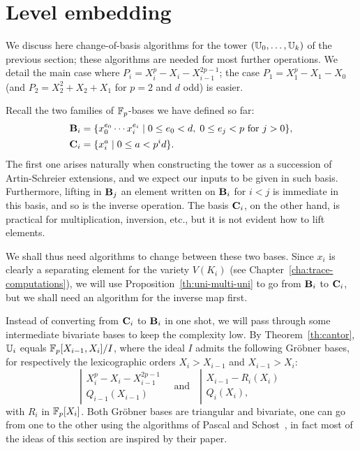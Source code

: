 \section{Level embedding}
\label{sec:level-embedding}

We discuss here change-of-basis algorithms for the tower $(\mathbb{U}_0,
\ldots, \mathbb{U}_k)$ of the previous section; these algorithms are needed
for most further operations. We detail the main case where $P_i =
X_i^p - X_i - X_{i-1}^{2p-1}$; the case $P_1= X_1^p - X_1 - X_0$ (and
$P_2=X_2^2+X_2+X_1$ for $p=2$ and $d$ odd) is easier.

Recall the two families of $\mathbb{F}_p$-bases we have defined so far:
\begin{align}
  \mathbf{B}_i &=
  \{x_0^{e_0} \cdots x_i^{e_i} \;|\; 0 \le e_0 < d,\; 0\le e_j < p 
  \text{ for $j>0$}\}
  \text{,}\\
  \mathbf{C}_i&=\{x_i^a \;|\; 0\le a<p^id\}
  \text{.}  
\end{align}
The first one arises naturally when constructing the tower as a
succession of Artin-Schreier extensions, and we expect our inputs to
be given in such basis. Furthermore, lifting in $\mathbf{B}_j$ an
element written on $\mathbf{B}_i$ for $i<j$ is immediate in this basis,
and so is the inverse operation. The basis $\mathbf{C}_i$, on the
other hand, is practical for multiplication, inversion, etc., but it
is not evident how to lift elements.

We shall thus need algorithms to change between these two bases. Since
$x_i$ is clearly a separating element for the variety $V(K_i)$ (see
Chapter~\ref{cha:trace-computations}), we will use
Proposition~\ref{th:uni-multi-uni} to go from $\mathbf{B}_i$ to
$\mathbf{C}_i$, but we shall need an algorithm for the inverse map first.

Instead of converting from $\mathbf{C}_i$ to $\mathbf{B}_i$ in one shot,
we will pass through some intermediate bivariate bases to keep the
complexity low. By Theorem~\ref{th:cantor}, $\mathbb{U}_i$ equals
$\mathbb{F}_p[X_{i-1},X_i]/I$, where the ideal $I$ admits the following
Gr{\"o}bner bases, for respectively the lexicographic orders
$X_i>X_{i-1}$ and $X_{i-1}>X_i$:
\begin{equation}
  \left |
  \begin{array}{rl}
    X_i^p - X_i - X_{i-1}^{2p-1} \\
    Q_{i-1}(X_{i-1})         
  \end{array}
\right.
  \quad \text{and}\quad
  \left |
  \begin{array}{rl}
    X_{i-1} - R_i(X_i) \\
    Q_i(X_i),
  \end{array}
\right.
\end{equation}
with $R_i$ in $\mathbb{F}_p[X_i]$. Both Gröbner bases are triangular and
bivariate, one can go from one to the other using the algorithms of
Pascal and Schost~\cite{pascal+schost06}, in fact most of the ideas of
this section are inspired by their paper.

